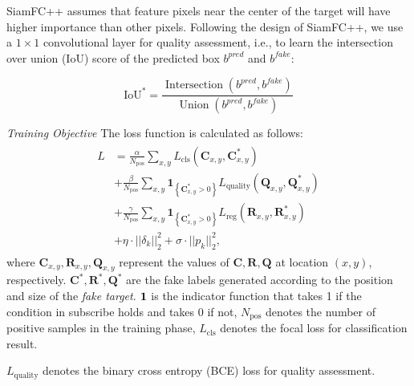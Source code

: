 \documentclass[journal]{IEEEtran}
\begin{document}
SiamFC++ assumes that feature pixels near the center of the target will have higher importance than other pixels. Following the design of SiamFC++, we use a $1 \times 1$ convolutional layer for quality assessment, i.e., to learn the intersection over union (IoU) score of the predicted box $b^{pred}$ and $b^{fake}$:

\begin{equation}
  \mathrm{IoU}^{*}=\frac{\operatorname{ Intersection }\left(b^{pred}, b^{fake}\right)}{\operatorname{Union}\left(b^{pred}, b^{fake}\right)}
\end{equation}

\textit{Training Objective} The loss function is calculated as follows:
\begin{equation}
\begin{array}{l}
\begin{aligned}
L&=\frac{\alpha}{N_{\mathrm{pos}}} \sum_{x, y} L_{\mathrm{cls}}\left(\textbf{C}_{x, y}, \textbf{C}_{x, y}^{*}\right) \\
&+\frac{\beta}{N_{\mathrm{pos}}} \sum_{x, y} \textbf{1}_{\left\{\textbf{C}_{x, y}^{*}>0\right\}} L_{\mathrm{quality}}\left(\textbf{Q}_{x, y}, \textbf{Q}_{x, y}^{*}\right) \\
&+\frac{\gamma}{N_{\mathrm{pos}}} \sum_{x, y} \textbf{1}_{\left\{\textbf{C}_{x, y}^{*}>0\right\}} L_{\mathrm{reg}}\left(\textbf{R}_{x, y}, \textbf{R}_{x, y}^{*}\right) \\
&+\eta \cdot ||\delta_k||_2^2 +  \sigma \cdot ||p_k||^2_2,
\end{aligned}
\end{array}
\label{eq:loss}
\end{equation}
where $\textbf{C}_{x, y}, \textbf{R}_{x, y}, \textbf{Q}_{x, y}$ represent the values of $\textbf{C}, \textbf{R}, \textbf{Q}$ at location $(x, y)$, respectively. $\textbf{C}^*, \textbf{R}^*, \textbf{Q}^*$ are the fake labels generated according to the position and size of the \textit{fake target}. $\textbf 1$ is the indicator function that takes 1 if the condition in subscribe holds and takes 0 if not, $N_{\mathrm{pos}}$ denotes the number of positive samples in the training phase, $L_{\mathrm{cls}}$ denotes the focal loss \cite{focal} for classification result.

$L_{\mathrm{quality}}$ denotes the binary cross entropy (BCE) loss for quality assessment.
\end{document}
